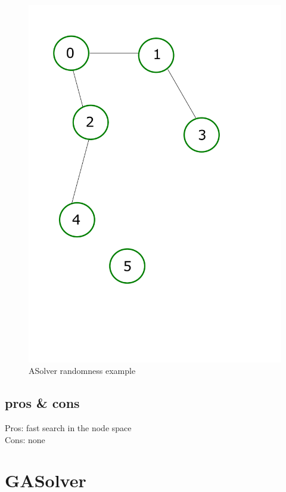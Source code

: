 \documentclass[english]{report}
\begin{document}
	\begin{figure}[H]
		\centering
		\includegraphics[scale=0.5]{nodi.pdf} 
		\caption{ASolver randomness example}
	\end{figure}
\subsection*{pros \& cons}
Pros: fast search in the node space\\
Cons: none
\section{GASolver}
\end{document}
